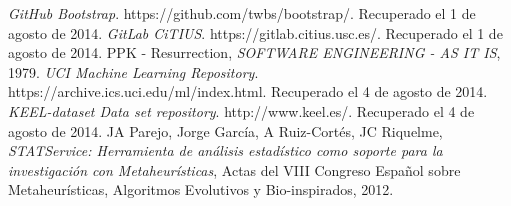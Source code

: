 \begin{thebibliography}{99}
 \textit{GitHub Bootstrap}. https://github.com/twbs/bootstrap/. Recuperado el 1 de agosto de 2014.
 \textit{GitLab CiTIUS}. https://gitlab.citius.usc.es/. Recuperado el 1 de agosto de 2014.
 PPK - Resurrection, \textit{SOFTWARE ENGINEERING - AS IT IS}, 1979.
 \textit{UCI Machine Learning Repository}. https://archive.ics.uci.edu/ml/index.html. Recuperado el 4 de agosto de 2014.
 \textit{KEEL-dataset Data set repository}. http://www.keel.es/. Recuperado el 4 de agosto de 2014.
 JA Parejo, Jorge García, A Ruiz-Cortés, JC Riquelme, \textit{STATService: Herramienta de análisis estadístico como soporte para la investigación con Metaheurísticas}, Actas del VIII Congreso Español sobre Metaheurísticas, Algoritmos Evolutivos y Bio-inspirados, 2012.
\end{thebibliography}